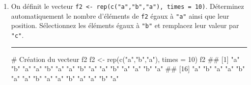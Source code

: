 \documentclass[12pt,twosided, notitlepage]{book}
\newenvironment{Shaded}{}{}
\newcommand{\KeywordTok}[1]{\textcolor[rgb]{0.00,0.00,1.00}{#1}}
\newcommand{\DataTypeTok}[1]{#1}
\newcommand{\DecValTok}[1]{#1}
\newcommand{\StringTok}[1]{\textcolor[rgb]{0.00,0.50,0.50}{#1}}
\newcommand{\CommentTok}[1]{\textcolor[rgb]{0.00,0.50,0.00}{#1}}
\newcommand{\OperatorTok}[1]{#1}
\newcommand{\NormalTok}[1]{#1}
\newif \ifsol
\renewenvironment{Shaded}{\begin{snugshade}}{\end{snugshade}}
\begin{document}
\begin{enumerate}
\begin{Shaded}
\end{Shaded}

  \begin{center} \rule{0.5\linewidth}{\linethickness}\end{center}

  \bigskip  \fi 
\item
  On définit le vecteur
  \texttt{f2\ \textless{}-\ rep(c("a","b","a"),\ times\ =\ 10)}.
  Déterminez automatiquement le nombre d'éléments de \texttt{f2} égaux à
  \texttt{"a"} ainsi que leur
  position\index{\texttt{[}}.
  Sélectionnez les éléments égaux à \texttt{"b"} et remplacez leur
  valeur par \texttt{"c"}.

  \ifsol 

  \begin{center} \rule{0.5\linewidth}{\linethickness}\end{center}

\begin{Shaded}
\begin{Highlighting}[]
\CommentTok{# Création du vecteur f2}
\NormalTok{f2 <-}\StringTok{ }\KeywordTok{rep}\NormalTok{(}\KeywordTok{c}\NormalTok{(}\StringTok{"a"}\NormalTok{,}\StringTok{"b"}\NormalTok{,}\StringTok{"a"}\NormalTok{), }\DataTypeTok{times =} \DecValTok{10}\NormalTok{)}
\NormalTok{f2}
\NormalTok{  ##  [1] "a" "b" "a" "a" "b" "a" "a" "b" "a" "a" "b" "a" "a" "b" "a"}
\NormalTok{  ## [16] "a" "b" "a" "a" "b" "a" "a" "b" "a" "a" "b" "a" "a" "b" "a"}


\end{Highlighting}
\end{Shaded}
\end{enumerate}
\end{document}
